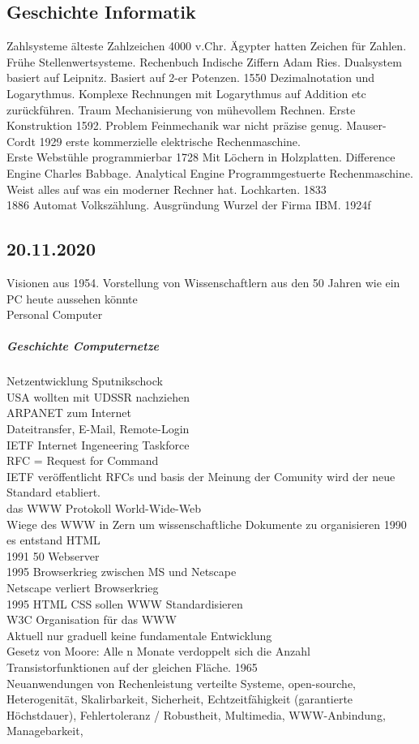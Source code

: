 \documentclass{article}
\begin{document}
	\subsection*{Geschichte Informatik}
	Zahlsysteme älteste Zahlzeichen 4000 v.Chr. Ägypter hatten Zeichen für Zahlen. \\
	Frühe Stellenwertsysteme. Rechenbuch Indische Ziffern Adam Ries. Dualsystem basiert auf Leipnitz. Basiert auf 2-er Potenzen. 1550 Dezimalnotation und Logarythmus. Komplexe Rechnungen mit Logarythmus auf Addition etc zurückführen. Traum Mechanisierung von mühevollem Rechnen. Erste Konstruktion 1592. Problem Feinmechanik war nicht präzise genug. Mauser-Cordt 1929 erste kommerzielle elektrische Rechenmaschine. \\
	Erste Webstühle programmierbar 1728 Mit Löchern in Holzplatten. Difference Engine Charles Babbage. Analytical Engine Programmgestuerte Rechenmaschine. Weist alles auf was ein moderner Rechner hat. Lochkarten. 1833 \\
	1886 Automat Volkszählung. Ausgründung Wurzel der Firma IBM. 1924f
	
	\subsection*{20.11.2020}
	Visionen aus 1954. Vorstellung von Wissenschaftlern aus den 50 Jahren wie ein PC heute aussehen könnte \\
	Personal Computer \\
	\subparagraph*{Geschichte Computernetze}
	Netzentwicklung Sputnikschock \\
	USA wollten mit UDSSR nachziehen \\
	ARPANET zum Internet \\
	Dateitransfer, E-Mail, Remote-Login \\
	IETF Internet Ingeneering Taskforce \\
	RFC = Request for Command \\
	IETF veröffentlicht RFCs und basis der Meinung der Comunity wird der neue Standard etabliert. \\
	das WWW Protokoll World-Wide-Web \\
	Wiege des WWW in Zern  um wissenschaftliche Dokumente zu organisieren 1990 es entstand HTML\\
	1991 50 Webserver \\
	1995 Browserkrieg zwischen MS und Netscape \\
	Netscape verliert Browserkrieg \\
	1995 HTML CSS sollen WWW Standardisieren \\
	W3C Organisation für das WWW \\
	Aktuell nur graduell keine fundamentale Entwicklung \\
	Gesetz von Moore: Alle n Monate verdoppelt sich die Anzahl Transistorfunktionen auf der gleichen Fläche. 1965 \\
	Neuanwendungen von Rechenleistung verteilte Systeme, open-sourche, Heterogenität, Skalirbarkeit, Sicherheit, Echtzeitfähigkeit (garantierte Höchstdauer), Fehlertoleranz / Robustheit, Multimedia, WWW-Anbindung, Managebarkeit, \\
\end{document}

